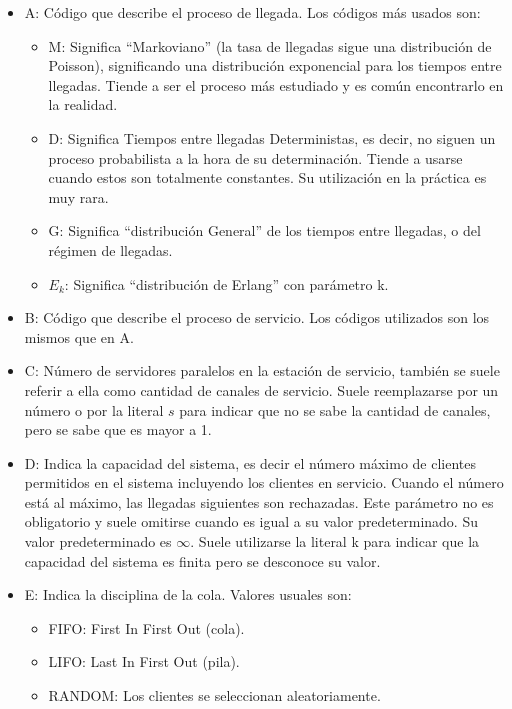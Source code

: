 \documentclass{article}
\begin{document}
\begin{itemize}
	\item \large{A: }
		Código que describe el proceso de llegada. Los códigos más usados son:
		\begin{itemize}
			\item \large{M: }
				Significa ``Markoviano'' 
				(la tasa de llegadas sigue una distribución de Poisson),
				significando una distribución exponencial para los 
				tiempos entre llegadas. Tiende a ser el proceso más
				estudiado y es común encontrarlo en la realidad.
			\item \large{D: }
				Significa Tiempos entre llegadas Deterministas, 
				es decir, no siguen un proceso probabilista a la
				hora de su determinación. Tiende a usarse cuando 
				estos son totalmente constantes. Su utilización 
				en la práctica es muy rara.
			\item \large{G: }
				Significa ``distribución General'' de los tiempos
				entre llegadas, o del régimen de llegadas.
			\item \large{$E_{k}$: }
				Significa ``distribución de Erlang'' con parámetro
				k.
		\end{itemize}
	\item \large{B: }
		Código que describe el proceso de servicio. Los códigos utilizados
		son los mismos que en A.
	\item \large{C: }
		Número de servidores paralelos en la estación de servicio, también 
		se suele referir a ella como cantidad de canales de servicio.
		Suele reemplazarse por un número o por la literal  $s$ para
		indicar que no se sabe la cantidad de canales, pero se sabe
		que es mayor a 1.
	\item \large{D: }
		Indica la capacidad del sistema, es decir el 
		número máximo de clientes permitidos en el sistema incluyendo
		los clientes en servicio.
		Cuando el número está al máximo, las llegadas siguientes son rechazadas.
		Este parámetro no es obligatorio y suele omitirse cuando es igual 
		a su valor predeterminado. Su valor predeterminado es $\infty$.
		Suele utilizarse la literal k para indicar que la capacidad del 
		sistema es finita pero se desconoce su valor.
	\item \large{E: }
		Indica la disciplina de la cola. Valores usuales son:
		\begin{itemize}
			\item \large{FIFO: } First In First Out (cola).
			\item \large{LIFO: } Last In First Out (pila).
			\item \large{RANDOM: } Los clientes se seleccionan aleatoriamente.

\end{itemize}
\end{itemize}
\end{document}
